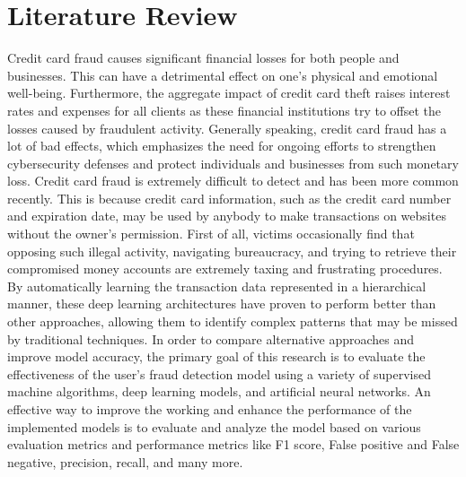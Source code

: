 \chapter{Literature Review}
\label{ch:lit_rev} %

Credit card fraud causes significant financial losses for both people and businesses. This can have a detrimental effect on one's physical and emotional well-being. Furthermore, the aggregate impact of credit card theft raises interest rates and expenses for all clients as these financial institutions try to offset the losses caused by fraudulent activity. Generally speaking, credit card fraud has a lot of bad effects, which emphasizes the need for ongoing efforts to strengthen cybersecurity defenses and protect individuals and businesses from such monetary loss. Credit card fraud is extremely difficult to detect and has been more common recently. This
is because credit card information, such as the credit card number and expiration date, may be used by anybody to make transactions on websites without the owner's permission. First of all, victims occasionally find that opposing such illegal activity, navigating bureaucracy, and trying to retrieve their compromised money accounts are extremely taxing and frustrating procedures. By automatically learning the transaction data represented in a hierarchical manner, these deep
learning architectures have proven to perform better than other approaches, allowing them to identify complex patterns that may be missed by traditional techniques. In order to compare alternative approaches and improve model accuracy, the primary goal of this research is to evaluate the effectiveness of the user's fraud detection model using a variety of supervised machine algorithms, deep learning models, and artificial neural networks. An effective way to improve the working and enhance the performance of the implemented models is to evaluate
and analyze the model based on various evaluation metrics and performance metrics like F1 score, False positive and False negative, precision, recall, and many more.

